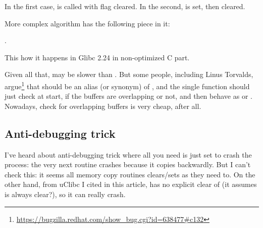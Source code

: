 In the first case,  is called with  flag cleared.
In the second,  is set, then cleared.

More complex algorithm has the following piece in it:

.

This how it happens in Glibc 2.24 in non-optimized C part.

Given all that,  may be slower than .
But some people, including Linus Torvalds, argue\footnote{\url{https://bugzilla.redhat.com/show_bug.cgi?id=638477\#c132}}
that  should be an alias (or synonym) of , and the single
function should just check at start, if the buffers are overlapping or not, and then behave as  or .
Nowadays, check for overlapping buffers is very cheap, after all.

\subsection{Anti-debugging trick}

I've heard about anti-debugging trick where all you need is just set  to crash the process: the very next 
routine crashes because it copies backwardly.
But I can't check this: it seems all memory copy routines clears/sets  as they need to.
On the other hand,  from uClibc I cited in this article,
has no explicit clear of  (it assumes  is always clear?),
so it can really crash.

